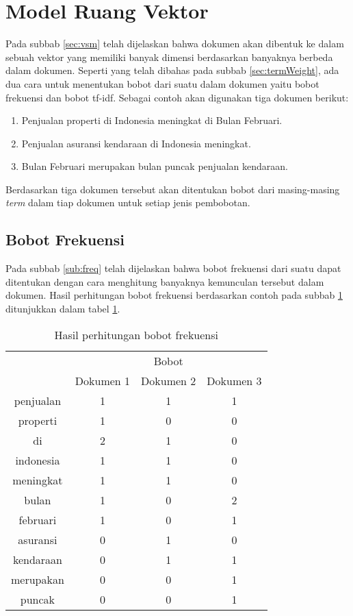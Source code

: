 \section{Model Ruang Vektor}
\label{sec:analysis:vsm}
Pada subbab \ref{sec:vsm} telah dijelaskan bahwa dokumen akan dibentuk ke dalam sebuah vektor yang memiliki banyak dimensi berdasarkan banyaknya \term berbeda dalam dokumen. Seperti yang telah dibahas pada subbab \ref{sec:termWeight}, ada dua cara untuk menentukan bobot dari suatu \term dalam dokumen yaitu bobot frekuensi dan bobot tf-idf. Sebagai contoh akan digunakan tiga dokumen berikut:

\begin{enumerate}
	\item Penjualan properti di Indonesia meningkat di Bulan Februari.
	\item Penjualan asuransi kendaraan di Indonesia meningkat.
	\item Bulan Februari merupakan bulan puncak penjualan kendaraan.
\end{enumerate}

Berdasarkan tiga dokumen tersebut akan ditentukan bobot dari masing-masing \textit{term} dalam tiap dokumen untuk setiap jenis pembobotan.

\subsection{Bobot Frekuensi}
Pada subbab \ref{sub:freq} telah dijelaskan bahwa bobot frekuensi dari suatu \term dapat ditentukan dengan cara menghitung banyaknya kemunculan \term tersebut dalam dokumen. Hasil perhitungan bobot frekuensi berdasarkan contoh pada subbab \ref{sec:analysis:vsm} ditunjukkan dalam tabel \ref{tbl:freq}.

\begin{table}[h]
	\centering
	\begin{tabular}{|c|c|c|c|} \hline
		\multirow{2}{*}{\Term} & \multicolumn{3}{c|}{Bobot} \\ \cline{2-4}
		& Dokumen 1 & Dokumen 2 & Dokumen 3 \\ \hline 
        penjualan & 1 & 1 & 1 \\ \hline
        properti & 1 & 0 & 0 \\ \hline
        di & 2 & 1 & 0 \\ \hline
        indonesia & 1 & 1 & 0 \\ \hline
        meningkat & 1 & 1 & 0 \\ \hline
        bulan & 1 & 0 & 2 \\ \hline
        februari & 1 & 0 & 1 \\ \hline
        asuransi & 0 & 1 & 0 \\ \hline
        kendaraan & 0 & 1 & 1 \\ \hline
        merupakan & 0 & 0 & 1 \\ \hline
        puncak & 0 & 0 & 1 \\ \hline
	\end{tabular}
	\caption{Hasil perhitungan bobot frekuensi}
	\label{tbl:freq}
\end{table}

